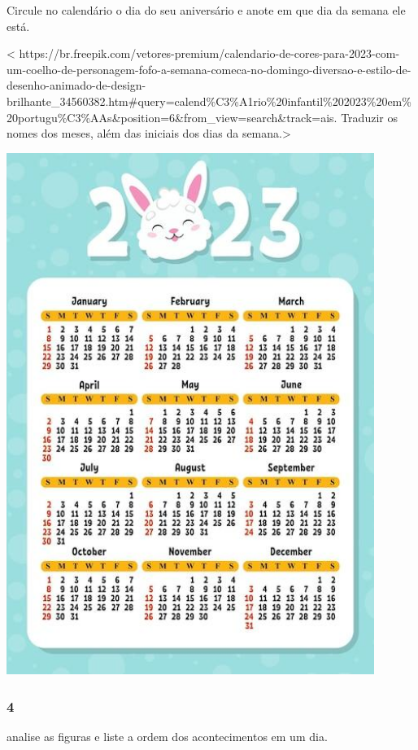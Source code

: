 Circule no calendário o dia do seu aniversário e anote em que dia da semana ele está.

\textless{}
https://br.freepik.com/vetores-premium/calendario-de-cores-para-2023-com-um-coelho-de-personagem-fofo-a-semana-comeca-no-domingo-diversao-e-estilo-de-desenho-animado-de-design-brilhante\_34560382.htm\#query=calend\%C3\%A1rio\%20infantil\%202023\%20em\%20portugu\%C3\%AAs\&position=6\&from\_view=search\&track=ais.
Traduzir os nomes dos meses, além das iniciais dos dias da
semana.\textgreater{}

\includegraphics[width=4.71050in,height=6.67143in]{media/image35.jpg}


\subsubsection{4}\label{section-42}

analise as figuras e liste a ordem dos acontecimentos em um dia.

